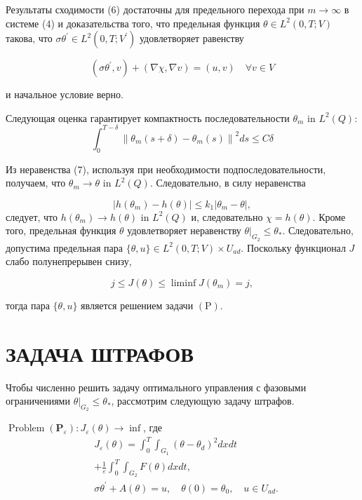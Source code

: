 \documentclass[10pt]{article}
\begin{document}
Результаты сходимости (6) достаточны для предельного перехода
при $m \rightarrow \infty$ в системе (4) и доказательства того,
что предельная функция $\theta \in L^{2}(0, T ; V) $ такова,
что $\sigma \theta^{\prime} \in L^{2}\left(0, T ; V^{\prime}\right)$ удовлетворяет равенству

\[
\left(\sigma \theta^{\prime}, v\right)+(\nabla \chi, \nabla v)=(u, v) \quad \forall v \in V
\]

и начальное условие верно.

Следующая оценка гарантирует компактность последовательности $\theta_{m}$ in $L^{2}(Q)$:
\[
\int_{0}^{T-\delta}\left\|\theta_{m}(s+\delta)-\theta_{m}(s)\right\|^{2} d s \leq C \delta
\]

Из неравенства (7), используя при необходимости подпоследовательности, получаем, что
$\theta_{m} \rightarrow \theta$ in $L^{2}(Q)$.
Следовательно, в силу неравенства

\[
\left|h\left(\theta_{m}\right)-h(\theta)\right| \leq k_{1}\left|\theta_{m}-\theta\right|,
\]
следует, что $h\left(\theta_{m}\right) \rightarrow h(\theta)$ in $L^{2}(Q)$
и, следовательно $\chi=h(\theta)$.
Кроме того, предельная функция $\theta$ удовлетворяет неравенству
$\left.\theta\right|_{G_{2}} \leq \theta_{*}$.
Следовательно, допустима предельная пара $\{\theta, u\} \in L^{2}(0, T ; V) \times U_{a d}$.
Поскольку функционал $J$ слабо полунепрерывен снизу,

\[
j \leq J(\theta) \leq \liminf J\left(\theta_{m}\right)=j,
\]

тогда пара $\{\theta, u\}$ является решением задачи $(\mathrm{P})$.

\section{ЗАДАЧА ШТРАФОВ}

Чтобы численно решить задачу оптимального управления с фазовыми ограничениями
$\left.\theta\right|_{G_{2}} \leq \theta_{*}$, рассмотрим следующую задачу штрафов.

$\operatorname{Problem}\left(\mathbf{P}_{\varepsilon}\right): J_{\varepsilon}(\theta) \rightarrow \inf$,
где
\[
\begin{aligned}
& J_{\varepsilon}(\theta)=\int_{0}^{T} \int_{G_{1}}\left(\theta-\theta_{d}\right)^{2} d x d t \\
& +\frac{1}{\varepsilon} \int_{0}^{T} \int_{G_{2}} F(\theta) d x d t, \\
& \sigma \theta^{\prime}+A(\theta)=u, \quad \theta(0)=\theta_{0}, \quad u \in U_{a d} .
\end{aligned}
\]
\end{document}
